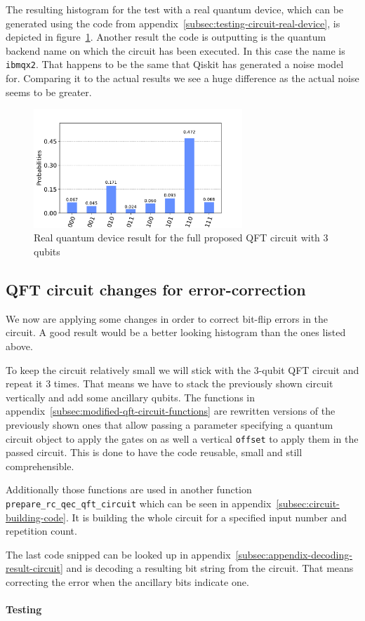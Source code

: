 The resulting histogram for the test with a real quantum device, which can be generated using the code from appendix~\ref{subsec:testing-circuit-real-device}, is depicted in figure~\ref{fig:test-histogram-real-device}.
Another result the code is outputting is the quantum backend name on which the circuit has been executed.
In this case the name is \texttt{ibmqx2}.
That happens to be the same that Qiskit has generated a noise model for.
Comparing it to the actual results we see a huge difference as the actual noise seems to be greater.

\begin{figure}[H]
    \centering
    \includegraphics[width=0.7\textwidth]{res/test-histogram-real-quantum-device.pdf}
    \caption{Real quantum device result for the full proposed QFT circuit with 3 qubits}
    \label{fig:test-histogram-real-device}
\end{figure}

\subsection{QFT circuit changes for error-correction}
\label{subsec:qft-circuit-error-correction}

We now are applying some changes in order to correct bit-flip errors in the circuit.
A good result would be a better looking histogram than the ones listed above.

To keep the circuit relatively small we will stick with the 3-qubit QFT circuit and repeat it 3 times.
That means we have to stack the previously shown circuit vertically and add some ancillary qubits.
The functions in appendix~\ref{subsec:modified-qft-circuit-functions} are rewritten versions of the previously shown ones that allow passing a parameter specifying a quantum circuit object to apply the gates on as well a vertical \texttt{offset} to apply them in the passed circuit.
This is done to have the code reusable, small and still comprehensible.

Additionally those functions are used in another function \texttt{prepare\_rc\_qec\_qft\_circuit} which can be seen in appendix~\ref{subsec:circuit-building-code}.
It is building the whole circuit for a specified input number and repetition count.

The last code snipped can be looked up in appendix~\ref{subsec:appendix-decoding-result-circuit} and is decoding a resulting bit string from the circuit.
That means correcting the error when the ancillary bits indicate one.

\paragraph{Testing}
